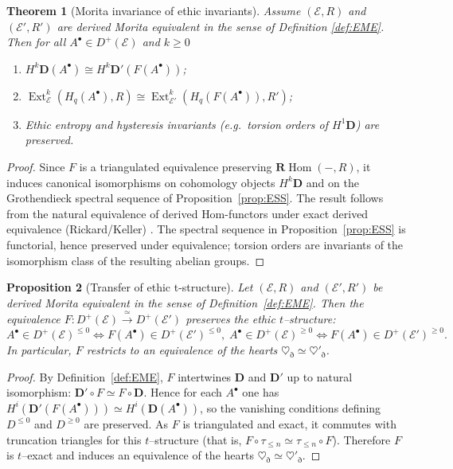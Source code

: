 \documentclass[12pt]{article}
\newcommand{\E}{\mathcal{E}}
\newcommand{\Ext}{\operatorname{Ext}}
\newcommand{\RHom}{\mathbf{R}\!\operatorname{Hom}}
\newcommand{\Dplus}{D^{+}}
\theoremstyle{plain}
\newtheorem{theorem}{Theorem}[section]
\newtheorem{proposition}[theorem]{Proposition}
\theoremstyle{definition}
\theoremstyle{remark}
\numberwithin{equation}{section}
\begin{document}
\begin{theorem}[Morita invariance of ethic invariants]\label{thm:MoritaInv}
Assume $(\E,R)$ and $(\E',R')$ are derived Morita equivalent
in the sense of Definition \ref{def:EME}. Then for all \(A^\bullet\in \Dplus(\E)\) and \(k\ge0\)
\begin{enumerate}[label=(\alph*)]
\item \(H^k\mathbf D(A^\bullet)\cong H^k\mathbf D'(F(A^\bullet))\);
\item \(\Ext^k_\E(H_q(A^\bullet),R)\cong \Ext^k_{\E'}(H_q(F(A^\bullet)),R')\);
\item Ethic entropy and hysteresis invariants (e.g.\ torsion orders of \(H^1\mathbf D\)) are preserved.
\end{enumerate}
\end{theorem}

\begin{proof}
Since $F$ is a triangulated equivalence preserving
$\RHom(-,R)$, it induces canonical isomorphisms on
cohomology objects $H^k\mathbf D$ and on the
Grothendieck spectral sequence of Proposition~\ref{prop:ESS}. The result follows from the natural equivalence of derived Hom-functors under exact derived equivalence (Rickard/Keller) \cite{Rickard1989,Keller1994}. The spectral sequence in Proposition~\ref{prop:ESS} is functorial, hence preserved under equivalence; torsion orders are invariants of the isomorphism class of the resulting abelian groups.
\end{proof}

\begin{proposition}[Transfer of ethic t-structure]\label{prop:TransferT}
Let $(\E,R)$ and $(\E',R')$ be derived Morita equivalent in the sense of
Definition~\ref{def:EME}.
Then the equivalence
$F:D^+(\E)\!\xrightarrow{\;\simeq\;} D^+(\E')$
preserves the ethic $t$–structure:
\[
A^\bullet\in D^+(\E)^{\le0} \iff F(A^\bullet)\in D^+(\E')^{\le0},
\;
A^\bullet\in D^+(\E)^{\ge0} \iff F(A^\bullet)\in D^+(\E')^{\ge0}.
\]
In particular, $F$ restricts to an equivalence of the hearts
\(\heartsuit_{\eth}\simeq \heartsuit'_{\eth}\).
\end{proposition}

\begin{proof}
By Definition~\ref{def:EME}, $F$ intertwines $\mathbf D$ and $\mathbf D'$
up to natural isomorphism:
$\mathbf D'\!\circ F \simeq F\!\circ \mathbf D$.
Hence for each $A^\bullet$ one has
$H^i(\mathbf D'(F(A^\bullet)))\simeq H^i(\mathbf D(A^\bullet))$,
so the vanishing conditions defining
$D^{\le0}$ and $D^{\ge0}$ are preserved.
As $F$ is triangulated and exact, it commutes with truncation triangles
for this $t$–structure (that is, $F\circ\tau_{\le n}\simeq\tau_{\le n}\circ F$).
Therefore $F$ is $t$–exact and induces an equivalence of the hearts
$\heartsuit_{\eth}\simeq\heartsuit'_{\eth}$.
\end{proof}
\end{document}

